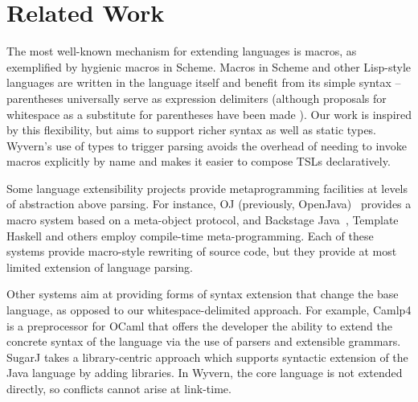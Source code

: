 \section{Related Work}
\label{s:related}


The most well-known mechanism for extending languages is macros, as exemplified by hygienic macros in Scheme. Macros in Scheme and other Lisp-style languages are written in the language itself and benefit from its simple syntax -- parentheses universally serve as expression delimiters (although proposals for whitespace as a substitute for parentheses have been made \cite{srfi-49}). Our work is inspired by this flexibility, but aims to support richer syntax as well as static types. Wyvern's use of types to trigger parsing  avoids the overhead of needing to invoke macros explicitly by name and makes it easier to compose TSLs declaratively.


Some language extensibility projects provide metaprogramming facilities at levels of abstraction above parsing.
For instance, OJ (previously, OpenJava)~\cite{Tatsubori00openjava:a} provides a macro system based on a meta-object
protocol, and Backstage Java~\cite{Palmer:2011:BJM:2048066.2048137}, Template Haskell \cite{sheard2002template} and others employ compile-time meta-programming.  Each of these systems provide macro-style rewriting of source code, but they provide at most limited extension of language parsing.

Other systems aim at providing forms of syntax extension that change the base language, as opposed to our whitespace-delimited approach.  For example, Camlp4 \cite{camlp4} is a preprocessor for OCaml that offers the developer the ability to extend the concrete syntax of the language via the use of parsers and extensible grammars.  SugarJ \cite{Erdweg:2011:SLL:2048147.2048199} takes a library-centric approach which supports syntactic extension of the Java language by adding libraries. In Wyvern, the core language
is not extended directly, so conflicts cannot arise at link-time. 


